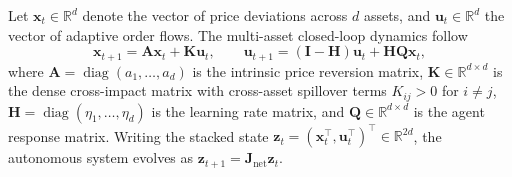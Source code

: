 \documentclass[10pt,twocolumn,letterpaper]{article}
\theoremstyle{definition}
\theoremstyle{remark}
\begin{document}
Let $\mathbf{x}_t \in \mathbb{R}^d$ denote the vector of price deviations across $d$ assets, and $\mathbf{u}_t \in \mathbb{R}^d$ the vector of adaptive order flows. The multi-asset closed-loop dynamics follow
\begin{equation}
\mathbf{x}_{t+1} = \mathbf{A}\mathbf{x}_t + \mathbf{K} \mathbf{u}_t, \qquad \mathbf{u}_{t+1} = (\mathbf{I} - \mathbf{H})\mathbf{u}_t + \mathbf{H} \mathbf{Q} \mathbf{x}_t,
\end{equation}
where $\mathbf{A} = \operatorname{diag}(a_1, \dots, a_d)$ is the intrinsic price reversion matrix, $\mathbf{K} \in \mathbb{R}^{d \times d}$ is the dense cross-impact matrix with cross-asset spillover terms $K_{ij} > 0$ for $i \ne j$, $\mathbf{H} = \operatorname{diag}(\eta_1, \dots, \eta_d)$ is the learning rate matrix, and $\mathbf{Q} \in \mathbb{R}^{d \times d}$ is the agent response matrix. Writing the stacked state $\mathbf{z}_t = (\mathbf{x}_t^\top, \mathbf{u}_t^\top)^\top \in \mathbb{R}^{2d}$, the autonomous system evolves as $\mathbf{z}_{t+1} = \mathbf{J}_{\text{net}} \mathbf{z}_t$.
\end{document}
